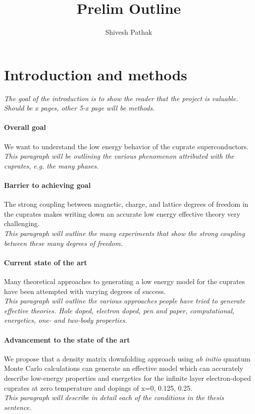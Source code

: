 \documentclass{article}
\title{Prelim Outline}
\author{Shivesh Pathak}
\begin{document}
\section{Introduction and methods}
\textit{The goal of the introduction is to show the reader that the project is valuable. Should be x pages, other 5-x page will be methods.}
\paragraph{Overall goal}
We want to understand the low energy behavior of the cuprate superconductors.
\\
\textit{This paragraph will be outlining the various phenomenon attributed with the cuprates, e.g. the many phases.}

\paragraph{Barrier to achieving goal}
The strong coupling between magnetic, charge, and lattice degrees of freedom in the cuprates makes writing down an accurate low energy effective theory very challenging.
\\
\textit{This paragraph will outline the many experiments that show the strong coupling between these many degrees of freedom.}

\paragraph{Current state of the art}
Many theoretical approaches to generating a low energy model for the cuprates have been attempted with varying degrees of success.
\\
\textit{This paragraph will outline the various approaches people have tried to generate effective theories. Hole doped, electron doped, pen and paper, computational, energetics, one- and two-body properties.}

\paragraph{Advancement to the state of the art}
We propose that a density matrix downfolding approach using \textit{ab initio} quantum Monte Carlo calculations can generate an effective model which can accurately describe low-energy properties and energetics for the infinite layer electron-doped cuprates at zero temperature and dopings of x=0, 0.125, 0.25.
\\
\textit{This paragraph will describe in detail each of the conditions in the thesis sentence.}
\end{document}
